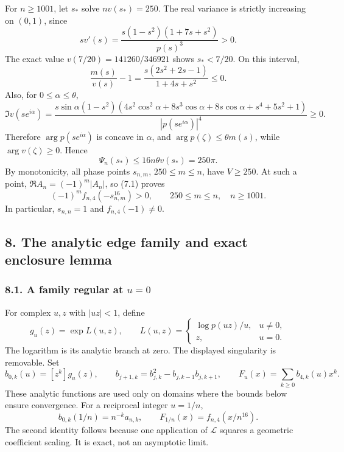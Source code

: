 \documentclass[
  11pt,
]{article}
\begin{document}
For \(n\ge1001\), let \(s_*\) solve \(nv(s_*)=250\). The real variance
is strictly increasing on \((0,1)\), since \[
 sv'(s)=\frac{s(1-s^2)(1+7s+s^2)}{p(s)^3}>0.
\] The exact value \(v(7/20)=141260/346921\) shows \(s_*<7/20\). On this
interval, \[
 \frac{m(s)}{v(s)}-1=\frac{s(2s^2+2s-1)}{1+4s+s^2}\le0.
\] Also, for \(0\le\alpha\le\theta\), \[
 \Im v(se^{i\alpha})=
 \frac{s\sin\alpha(1-s^2)
 (4s^2\cos^2\alpha+8s^3\cos\alpha+8s\cos\alpha+s^4+5s^2+1)}
 {|p(se^{i\alpha})|^4}\ge0.
\] Therefore \(\arg p(se^{i\alpha})\) is concave in \(\alpha\), and
\(\arg p(\zeta)\le\theta m(s)\), while \(\arg v(\zeta)\ge0\). Hence \[
 \Psi_n(s_*)\le16n\theta v(s_*)=250\pi.                      \tag{7.3}
\] By monotonicity, all phase points \(s_{n,m}\), \(250\le m\le n\),
have \(V\ge250\). At such a point, \(\Re A_n=(-1)^m|A_n|\), so (7.1)
proves \[
 (-1)^m f_{n,4}(-s_{n,m}^{16})>0,
 \qquad250\le m\le n,\quad n\ge1001.                         \tag{7.4}
\] In particular, \(s_{n,n}=1\) and \(f_{n,4}(-1)\ne0\).

\subsection{8. The analytic edge family and exact enclosure
lemma}\label{the-analytic-edge-family-and-exact-enclosure-lemma}

\subsubsection{\texorpdfstring{8.1. A family regular at
\(u=0\)}{8.1. A family regular at u=0}}\label{a-family-regular-at-u0}

For complex \(u,z\) with \(|uz|<1\), define \[
 g_u(z)=\exp L(u,z),\qquad
 L(u,z)=\begin{cases}\log p(uz)/u,&u\ne0,\\z,&u=0.\end{cases} 
\] The logarithm is its analytic branch at zero. The displayed
singularity is removable. Set \[
 b_{0,k}(u)=[z^k]g_u(z),\qquad b_{j+1,k}=b_{j,k}^2-b_{j,k-1}b_{j,k+1},
 \qquad F_u(x)=\sum_{k\ge0}b_{4,k}(u)x^k.                     \tag{8.1}
\] These analytic functions are used only on domains where the bounds
below ensure convergence. For a reciprocal integer \(u=1/n\), \[
 b_{0,k}(1/n)=n^{-k}a_{n,k},\qquad
 F_{1/n}(x)=f_{n,4}(x/n^{16}).                               \tag{8.2}
\] The second identity follows because one application of \(\mathcal L\)
squares a geometric coefficient scaling. It is exact, not an asymptotic
limit.
\end{document}
